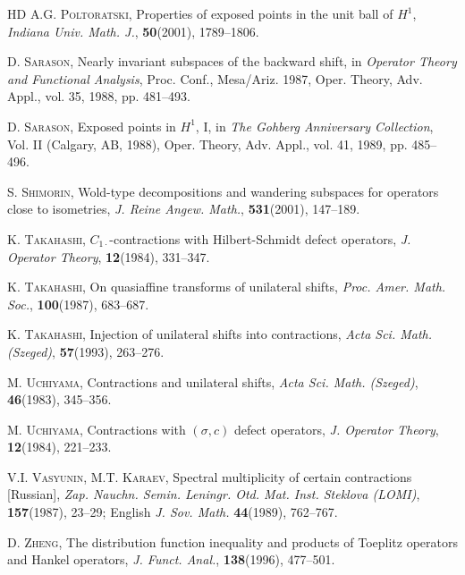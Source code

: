 \documentclass[a4paper,oneside,11pt]{amsart}
\numberwithin{equation}{section}
\theoremstyle{plain}
\theoremstyle{definition}
\begin{document}
\begin{thebibliography}{HD}
  \textsc{A.G. Poltoratski},  Properties of exposed points in the unit ball of $H^1$,
 \textit{Indiana Univ. Math. J.}, \textbf{50}(2001), 1789--1806. 

 \textsc{D. Sarason}, Nearly invariant subspaces of the backward shift, in  
\textit{Operator Theory and Functional Analysis}, 
Proc. Conf., Mesa/Ariz. 1987, Oper. Theory, Adv. Appl., vol. 35, 1988, pp. 481--493.  

\textsc{D. Sarason}, Exposed points in $H^1$, I, in \textit{The Gohberg Anniversary Collection}, Vol. II (Calgary, AB, 1988), 
 Oper. Theory, Adv. Appl., vol. 41, 1989, pp. 485--496.

  \textsc{S. Shimorin}, Wold-type decompositions and wandering subspaces for operators close to isometries, \textit{J. Reine Angew. Math.}, \textbf{531}(2001), 147--189.

  \textsc{K. Takahashi},  $C_{1\cdot}$-contractions with Hilbert-Schmidt defect operators, 
\textit{J. Operator Theory},  \textbf{12}(1984), 331--347.

   \textsc{K. Takahashi},  On quasiaffine transforms of unilateral shifts, 
\textit{Proc. Amer. Math. Soc.}, \textbf{100}(1987), 683--687.

   \textsc{K. Takahashi}, Injection of unilateral shifts into 
           contractions, \textit{Acta Sci. Math. (Szeged)},   \textbf{57}(1993), 263--276.

  \textsc{M. Uchiyama},  Contractions and unilateral shifts,  
 \textit{Acta Sci. Math. (Szeged)},   \textbf{46}(1983), 345--356.

 \textsc{M. Uchiyama},  Contractions with $(\sigma,c)$ defect operators, 
\textit{J. Operator Theory},  \textbf{12}(1984),  221--233.

 \textsc{V.I.  Vasyunin, M.T. Karaev}, Spectral multiplicity of certain contractions
 [Russian], 
\textit{Zap. Nauchn. Semin. Leningr. Otd. Mat. Inst. Steklova (LOMI)},  \textbf{157}(1987), 23--29; 
 English \textit{J. Sov. Math.}  \textbf{44}(1989), 762--767.

  \textsc{D. Zheng}, The distribution function inequality and products of Toeplitz operators and Hankel operators, \textit{J. Funct.  Anal.},  \textbf{138}(1996), 477--501.

\end{thebibliography}
\end{document}
